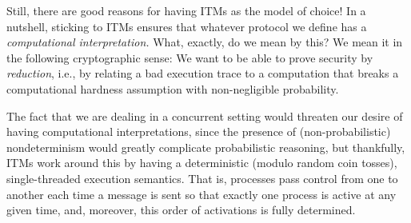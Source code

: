 Still, there are good reasons for having ITMs as the model of choice! In a
nutshell, sticking to ITMs ensures that whatever protocol we define has a
\emph{computational interpretation.} What, exactly, do we mean by this? We mean
it in the following cryptographic sense: We want to be able to prove security by
\emph{reduction}, i.e., by relating a bad execution trace to a computation that
breaks a computational hardness assumption with non-negligible probability.

The fact that we are dealing in a concurrent setting would threaten our desire of
having computational interpretations, since the presence of (non-probabilistic)
nondeterminism would greatly complicate probabilistic reasoning, but thankfully,
ITMs work around this by having a deterministic (modulo random coin tosses),
single-threaded execution semantics. That is, processes pass control from one to
another each time a message is sent so that exactly one process is active at any
given time, and, moreover, this order of activations is fully determined.



